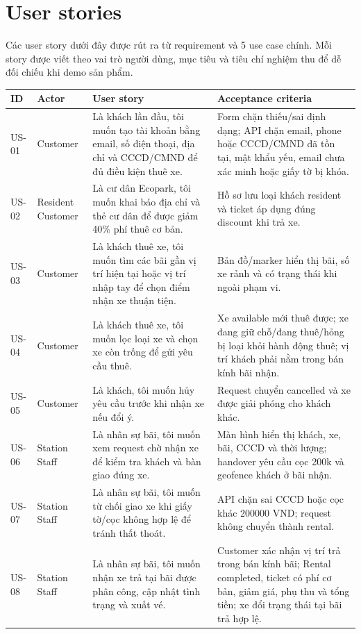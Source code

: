 \section{User stories}

Các user story dưới đây được rút ra từ requirement và 5 use case chính. Mỗi story
được viết theo vai trò người dùng, mục tiêu và tiêu chí nghiệm thu để dễ đối chiếu
khi demo sản phẩm.

\begin{longtable}{P{0.10\textwidth}P{0.18\textwidth}P{0.42\textwidth}P{0.20\textwidth}}
\toprule
\textbf{ID} & \textbf{Actor} & \textbf{User story} & \textbf{Acceptance criteria} \\
\midrule
US-01 & Customer & Là khách lần đầu, tôi muốn tạo tài khoản bằng email, số điện thoại, địa chỉ và CCCD/CMND để đủ điều kiện thuê xe. & Form chặn thiếu/sai định dạng; API chặn email, phone hoặc CCCD/CMND đã tồn tại, mật khẩu yếu, email chưa xác minh hoặc giấy tờ bị khóa. \\
US-02 & Resident Customer & Là cư dân Ecopark, tôi muốn khai báo địa chỉ và thẻ cư dân để được giảm 40\% phí thuê cơ bản. & Hồ sơ lưu loại khách resident và ticket áp dụng đúng discount khi trả xe. \\
US-03 & Customer & Là khách thuê xe, tôi muốn tìm các bãi gần vị trí hiện tại hoặc vị trí nhập tay để chọn điểm nhận xe thuận tiện. & Bản đồ/marker hiển thị bãi, số xe rảnh và có trạng thái khi ngoài phạm vi. \\
US-04 & Customer & Là khách thuê xe, tôi muốn lọc loại xe và chọn xe còn trống để gửi yêu cầu thuê. & Xe available mới thuê được; xe đang giữ chỗ/đang thuê/hỏng bị loại khỏi hành động thuê; vị trí khách phải nằm trong bán kính bãi nhận. \\
US-05 & Customer & Là khách, tôi muốn hủy yêu cầu trước khi nhận xe nếu đổi ý. & Request chuyển cancelled và xe được giải phóng cho khách khác. \\
US-06 & Station Staff & Là nhân sự bãi, tôi muốn xem request chờ nhận xe để kiểm tra khách và bàn giao đúng xe. & Màn hình hiển thị khách, xe, bãi, CCCD và thời lượng; handover yêu cầu cọc 200k và geofence khách ở bãi nhận. \\
US-07 & Station Staff & Là nhân sự bãi, tôi muốn từ chối giao xe khi giấy tờ/cọc không hợp lệ để tránh thất thoát. & API chặn sai CCCD hoặc cọc khác 200000 VND; request không chuyển thành rental. \\
US-08 & Station Staff & Là nhân sự bãi, tôi muốn nhận xe trả tại bãi được phân công, cập nhật tình trạng và xuất vé. & Customer xác nhận vị trí trả trong bán kính bãi; Rental completed, ticket có phí cơ bản, giảm giá, phụ thu và tổng tiền; xe đổi trạng thái tại bãi trả hợp lệ. \\

\end{longtable}
